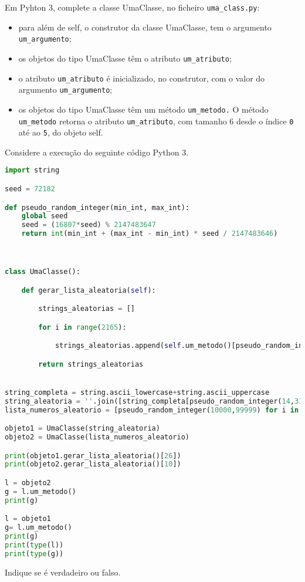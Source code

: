 \documentclass[12pt,varwidth=16cm,border=17pt]{standalone}
\begin{document}
Em Pyhton 3, complete a classe UmaClasse, no ficheiro \verb+uma_class.py+:

\begin{itemize}
  \item para além de self, o construtor da classe UmaClasse, tem o argumento \verb+um_argumento+;
  \item os objetos do tipo UmaClasse têm o atributo \verb+um_atributo+;
  \item o atributo \verb+um_atributo+ é inicializado, no construtor, com o valor
do argumento \verb+um_argumento+;
  \item os objetos do tipo UmaClasse têm um método \verb+um_metodo.+ O
    método \verb+um_metodo+ retorna o atributo \verb+um_atributo+, com tamanho 6 desde o índice \verb+0+ até ao \verb+5+, do objeto self.
\end{itemize}

Considere a execução do seguinte código Python 3.



\begin{lstlisting}[language=Python]
import string

seed = 72182

def pseudo_random_integer(min_int, max_int):
    global seed
    seed = (16807*seed) % 2147483647
    return int(min_int + (max_int - min_int) * seed / 2147483646)



class UmaClasse():

	def gerar_lista_aleatoria(self):

		strings_aleatorias = []

		for i in range(2165):

			strings_aleatorias.append(self.um_metodo()[pseudo_random_integer(0, 5)])

		return strings_aleatorias


string_completa = string.ascii_lowercase+string.ascii_uppercase
string_aleatoria = ''.join([string_completa[pseudo_random_integer(14,31)] for i in range(2165)])
lista_numeros_aleatorio = [pseudo_random_integer(10000,99999) for i in range(2165)]

objeto1 = UmaClasse(string_aleatoria)
objeto2 = UmaClasse(lista_numeros_aleatorio)

print(objeto1.gerar_lista_aleatoria()[26])
print(objeto2.gerar_lista_aleatoria()[10])

l = objeto2
g = l.um_metodo()
print(g)

l = objeto1
g= l.um_metodo()
print(g)
print(type(l))
print(type(g))
\end{lstlisting}

Indique se é verdadeiro ou falso.
\end{document}
